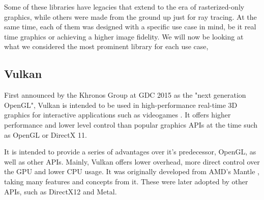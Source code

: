 Some of these libraries have legacies that extend to the era of rasterized-only graphics, while others were made from the ground up just for ray tracing. At the same time, each of them was designed with a specific use case in mind, be it real time graphics or achieving a higher image fidelity. We will now be looking at what we considered the most prominent library for each use case,

\subsection{Vulkan}
First announced by the Khronos Group at GDC 2015 as the "next generation OpenGL", Vulkan is intended to be used in high-performance real-time 3D graphics for interactive applications such as videogames \cite{van2022novel} \cite{nikolaev20223d}. It offers higher performance and lower level control than popular graphics APIs at the time such as OpenGL or DirectX 11.

It is intended to provide a series of advantages over it's predecessor, OpenGL, as well as other APIs. Mainly, Vulkan offers lower overhead, more direct control over the GPU and lower CPU usage. It was originally developed from AMD's Mantle \cite{Mantle}, taking many features and concepts from it. These were later adopted by other APIs, such as DirectX12 and Metal.

